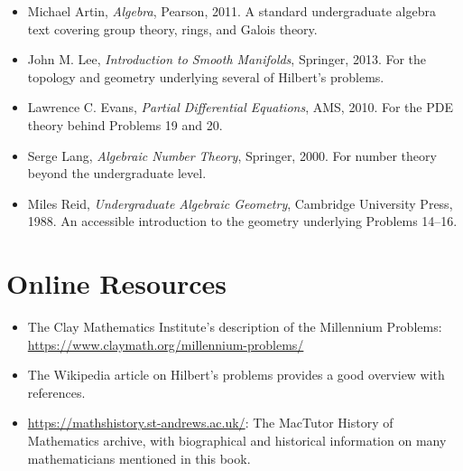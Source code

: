 \begin{itemize}
    \item Michael Artin, \textit{Algebra}, Pearson, 2011. A standard undergraduate algebra text covering group theory, rings, and Galois theory.

    \item John M. Lee, \textit{Introduction to Smooth Manifolds}, Springer, 2013. For the topology and geometry underlying several of Hilbert's problems.

    \item Lawrence C. Evans, \textit{Partial Differential Equations}, AMS, 2010. For the PDE theory behind Problems 19 and 20.

    \item Serge Lang, \textit{Algebraic Number Theory}, Springer, 2000. For number theory beyond the undergraduate level.

    \item Miles Reid, \textit{Undergraduate Algebraic Geometry}, Cambridge University Press, 1988. An accessible introduction to the geometry underlying Problems 14--16.
\end{itemize}

\section*{Online Resources}

\begin{itemize}
    \item The Clay Mathematics Institute's description of the Millennium Problems: \url{https://www.claymath.org/millennium-problems/}

    \item The Wikipedia article on Hilbert's problems provides a good overview with references.

    \item \url{https://mathshistory.st-andrews.ac.uk/}: The MacTutor History of Mathematics archive, with biographical and historical information on many mathematicians mentioned in this book.
\end{itemize}
